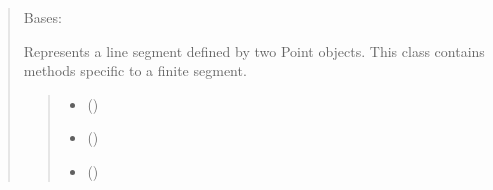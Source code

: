 \documentclass[letterpaper,10pt,english]{sphinxmanual}
\begin{document}
\begin{quote}
\begin{fulllineitems}
\begin{fulllineitems}
\end{fulllineitems}


\end{fulllineitems}


\begin{fulllineitems}
\label{\detokenize{pygeox:pygeox.basic_objects.LineSegment}}
\pysigstartsignatures
\pysiglinewithargsret
{}
{\sphinxparamcomma {}\sphinxparamcomma {}}
{}
\pysigstopsignatures
\sphinxAtStartPar
Bases: 

\sphinxAtStartPar
Represents a line segment defined by two Point objects.
This class contains methods specific to a finite segment.
\begin{quote}\begin{description}
\begin{itemize}
\item {} 
\sphinxAtStartPar
{} ()

\item {} 
\sphinxAtStartPar
{} ()

\item {} 
\sphinxAtStartPar
{} (\sphinxstyleliteralemphasis{\sphinxupquote{ | }})

\end{itemize}

\end{description}\end{quote}


\end{fulllineitems}
\end{quote}
\end{document}
